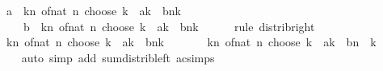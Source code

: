 \begin{isabellebody}
\ {\isachardoublequoteopen}{\isasymdots}\ {\isacharequal}{\kern0pt}\ a\ {\isacharasterisk}{\kern0pt}\ {\isacharparenleft}{\kern0pt}{\isasymSum}k{\isasymle}n{\isachardot}{\kern0pt}\ of{\isacharunderscore}{\kern0pt}nat\ {\isacharparenleft}{\kern0pt}n\ choose\ k{\isacharparenright}{\kern0pt}\ {\isacharasterisk}{\kern0pt}\ a{\isacharcircum}{\kern0pt}k\ {\isacharasterisk}{\kern0pt}\ b{\isacharcircum}{\kern0pt}{\isacharparenleft}{\kern0pt}n{\isacharminus}{\kern0pt}k{\isacharparenright}{\kern0pt}{\isacharparenright}{\kern0pt}\ {\isacharplus}{\kern0pt}\isanewline
\ \ \ \ \ \ b\ {\isacharasterisk}{\kern0pt}\ {\isacharparenleft}{\kern0pt}{\isasymSum}k{\isasymle}n{\isachardot}{\kern0pt}\ of{\isacharunderscore}{\kern0pt}nat\ {\isacharparenleft}{\kern0pt}n\ choose\ k{\isacharparenright}{\kern0pt}\ {\isacharasterisk}{\kern0pt}\ a{\isacharcircum}{\kern0pt}k\ {\isacharasterisk}{\kern0pt}\ b{\isacharcircum}{\kern0pt}{\isacharparenleft}{\kern0pt}n{\isacharminus}{\kern0pt}k{\isacharparenright}{\kern0pt}{\isacharparenright}{\kern0pt}{\isachardoublequoteclose}\isanewline
\ \ \ \ \isamarkupfalse%
\ {\isacharparenleft}{\kern0pt}rule\ distrib{\isacharunderscore}{\kern0pt}right{\isacharparenright}{\kern0pt}\isanewline
\ \ \isamarkupfalse%
\ \isamarkupfalse%
\ {\isachardoublequoteopen}{\isasymdots}\ {\isacharequal}{\kern0pt}\ {\isacharparenleft}{\kern0pt}{\isasymSum}k{\isasymle}n{\isachardot}{\kern0pt}\ of{\isacharunderscore}{\kern0pt}nat\ {\isacharparenleft}{\kern0pt}n\ choose\ k{\isacharparenright}{\kern0pt}\ {\isacharasterisk}{\kern0pt}\ a{\isacharcircum}{\kern0pt}{\isacharparenleft}{\kern0pt}k{\isacharplus}{\kern0pt}{}{\isacharparenright}{\kern0pt}\ {\isacharasterisk}{\kern0pt}\ b{\isacharcircum}{\kern0pt}{\isacharparenleft}{\kern0pt}n{\isacharminus}{\kern0pt}k{\isacharparenright}{\kern0pt}{\isacharparenright}{\kern0pt}\ {\isacharplus}{\kern0pt}\isanewline
\ \ \ \ \ \ {\isacharparenleft}{\kern0pt}{\isasymSum}k{\isasymle}n{\isachardot}{\kern0pt}\ of{\isacharunderscore}{\kern0pt}nat\ {\isacharparenleft}{\kern0pt}n\ choose\ k{\isacharparenright}{\kern0pt}\ {\isacharasterisk}{\kern0pt}\ a{\isacharcircum}{\kern0pt}k\ {\isacharasterisk}{\kern0pt}\ b{\isacharcircum}{\kern0pt}{\isacharparenleft}{\kern0pt}n\ {\isacharminus}{\kern0pt}\ k\ {\isacharplus}{\kern0pt}\ {}{\isacharparenright}{\kern0pt}{\isacharparenright}{\kern0pt}{\isachardoublequoteclose}\isanewline
\ \ \ \ \isamarkupfalse%
\ {\isacharparenleft}{\kern0pt}auto\ simp\ add{\isacharcolon}{\kern0pt}\ sum{\isacharunderscore}{\kern0pt}distrib{\isacharunderscore}{\kern0pt}left\ ac{\isacharunderscore}{\kern0pt}simps{\isacharparenright}{\kern0pt}\isanewline

\end{isabellebody}
